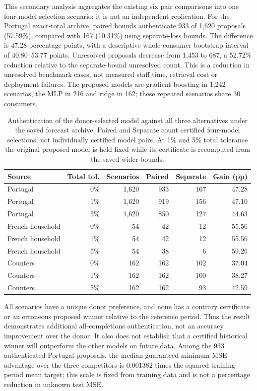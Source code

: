 This secondary analysis aggregates the existing six pair comparisons into
one four-model selection scenario; it is not an independent replication.
For the Portugal exact-total archive, paired bounds authenticate 933 of
1,620 proposals (57.59\%), compared with 167 (10.31\%) using separate-loss
bounds. The difference is 47.28 percentage points, with a descriptive
whole-consumer bootstrap interval of 40.80--53.77 points. Unresolved
proposals decrease from 1,453 to 687, a 52.72\% reduction relative to the
separate-bound unresolved count. This is a reduction in unresolved
benchmark cases, not measured staff time, retrieval cost or deployment
failures. The proposed models are gradient boosting in 1,242 scenarios,
the MLP in 216 and ridge in 162; these repeated scenarios share 30 consumers.

\begin{table}[htbp]
\centering\small
\caption{Authentication of the donor-selected model against all three
alternatives under the saved forecast archive. Paired and Separate count
certified four-model selections, not individually certified model pairs.
At 1\% and 5\% total tolerance the original proposed model is held fixed
while its certificate is recomputed from the saved wider bounds.}
\label{tab:practical-model-selection}
\begin{tabular}{lrrrrr}
\toprule
Source & Total tol. & Scenarios & Paired & Separate & Gain (pp)\\
\midrule
Portugal & 0\% & 1,620 & 933 & 167 & 47.28 \\
Portugal & 1\% & 1,620 & 919 & 156 & 47.10 \\
Portugal & 5\% & 1,620 & 850 & 127 & 44.63 \\
French household & 0\% & 54 & 42 & 12 & 55.56 \\
French household & 1\% & 54 & 42 & 12 & 55.56 \\
French household & 5\% & 54 & 38 & 6 & 59.26 \\
Counters & 0\% & 162 & 162 & 102 & 37.04 \\
Counters & 1\% & 162 & 162 & 100 & 38.27 \\
Counters & 5\% & 162 & 162 & 93 & 42.59 \\
\bottomrule
\end{tabular}
\end{table}
\FloatBarrier

All scenarios have a unique donor preference, and none has a contrary
certificate or an erroneous proposed winner relative to the reference
period. Thus the result demonstrates additional all-completions
authentication, not an accuracy improvement over the donor. It also does
not establish that a certified historical winner will outperform the
other models on future data. Among the 933 authenticated Portugal
proposals, the median guaranteed minimum MSE advantage over the three
competitors is $0.001382$ times the squared training-period mean target;
this scale is fixed from training data and is not a percentage reduction
in unknown test MSE.

